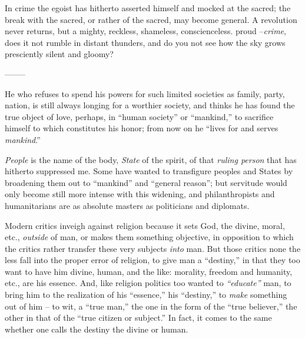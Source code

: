 \documentclass[12pt,a4paper]{book}
\begin{document}
In crime the egoist has hitherto asserted himself and mocked at the sacred; 
the break with the sacred, or rather of the sacred, may become general. A 
revolution never returns, but a mighty, reckless, shameless, conscienceless. 
proud --\textit{crime}, does it not rumble in distant thunders, and do you not 
see how the sky grows presciently silent and gloomy?

\begin{center}
--------\end{center}


He who refuses to spend his powers for such limited societies as family, 
party, nation, is still always longing for a worthier society, and thinks he 
has found the true object of love, perhaps, in ``human society'' or 
``mankind,'' to sacrifice himself to which constitutes his honor; from now 
on he ``lives for and serves \textit{mankind}.''

\textit{People} is the name of the body, \textit{State} of the spirit, of that 
\textit{ruling person} that has hitherto suppressed me. Some have wanted to 
transfigure peoples and States by broadening them out to ``mankind'' and 
``general reason''; but servitude would only become still more intense with 
this widening, and philanthropists and humanitarians are as absolute masters 
as politicians and diplomats.

Modern critics inveigh against religion because it sets God, the divine, 
moral, etc., \textit{outside} of man, or makes them something objective, in 
opposition to which the critics rather transfer these very subjects 
\textit{into} man. But those critics none the less fall into the proper error 
of religion, to give man a ``destiny,'' in that they too want to have him 
divine, human, and the like: morality, freedom and humanity, etc., are his 
essence. And, like religion politics too wanted to \textit{``educate''} man, 
to bring him to the realization of his ``essence,'' his ``destiny,'' to 
\textit{make} something out of him -- to wit, a ``true man,'' the one in the 
form of the ``true believer,'' the other in that of the ``true citizen or 
subject.'' In fact, it comes to the same whether one calls the destiny the 
divine or human.
\end{document}
